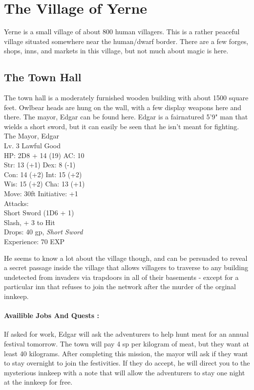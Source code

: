 \documentclass[10pt]{report}
\begin{document}
\section{The Village of Yerne}
\begin{multicols}{2}
	Yerne is a small village of about 800 human villagers. This is a rather peaceful village situated somewhere near the human/dwarf border. There are a few forges, shops, inns, and markets in this village, but not much about magic is here.
	
\subsection{The Town Hall}The town hall is a moderately furnished wooden building with about 1500 square feet. Owlbear heads are hung on the wall, with a few display weapons here and there. The mayor, Edgar can be found here. Edgar is a fairnatured 5'9" man that wields a short sword, but it can easily be seen that he isn't meant for fighting. \\



	
	
\columnbreak
The Mayor, Edgar\\
Lv. 3 Lawful Good \\
HP: 2D8 + 14 (19) AC: 10 \\
Str: 13 (+1) Dex:  8 (-1) \\
Con: 14 (+2) Int: 15 (+2) \\
Wis: 15 (+2) Cha: 13 (+1) \\
Move: 30ft Initiative: +1 \\
Attacks: 
\medskip \\
Short Sword (1D6 + 1)  \\
Slash, + 3 to Hit 
\medskip \\
Drops: 40 gp, \textit{Short Sword} \\
Experience: 70 EXP \\


\end{multicols}

He seems to know a lot about the village though, and can be persuaded to reveal a secret passage inside the village that allows villagers to traverse to any building undetected from invaders via trapdoors in all of their basements - except for a particular inn that refuses to join the network after the murder of the orginal innkeep. 


\paragraph{Availible Jobs And Quests :} If asked for work, Edgar will ask the adventurers to help hunt meat for an annual festival tomorrow. The town will pay 4 sp per kilogram of meat, but they want at least 40 kilograms. After completing this mission, the mayor will ask if they want to stay overnight to join the festivities. If they do accept, he will direct you to the mysterious innkeep with a note that will allow the adventurers to stay one night at the innkeep for free. 
\end{document}
